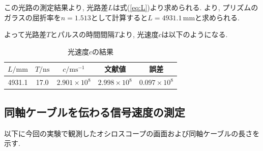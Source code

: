 \documentclass{jarticle}
\begin{document}
この光路の測定結果より, 光路差$L$は式(\ref{eq:L})より求められる.
\cite{Glass-Materials}より, プリズムのガラスの屈折率を$n=1.513$として計算すると$L=4931.1\,\mathrm{mm}$と求められる.

よって光路差$T$とパルスの時間間隔$T$より, 光速度$c$は以下のようになる.

\begin{table}[h]
  \centering
  \caption{光速度$c$の結果}
  \begin{tabular}{ccccc}
    \hline
    $L/\mathrm{mm}$ & $T/\mathrm{ns}$ & $c/\mathrm{ms^{-1}}$ & 文献値\cite{light-speed} & 誤差 \\
    \hline
    4931.1 & 17.0 & $2.901\times10^8$ & $2.998\times10^8$ & $0.097\times10^8$ \\
    \hline
  \end{tabular}
\end{table}


\subsection{同軸ケーブルを伝わる信号速度の測定}

以下に今回の実験で観測したオシロスコープの画面および同軸ケーブルの長さを示す.
\end{document}
